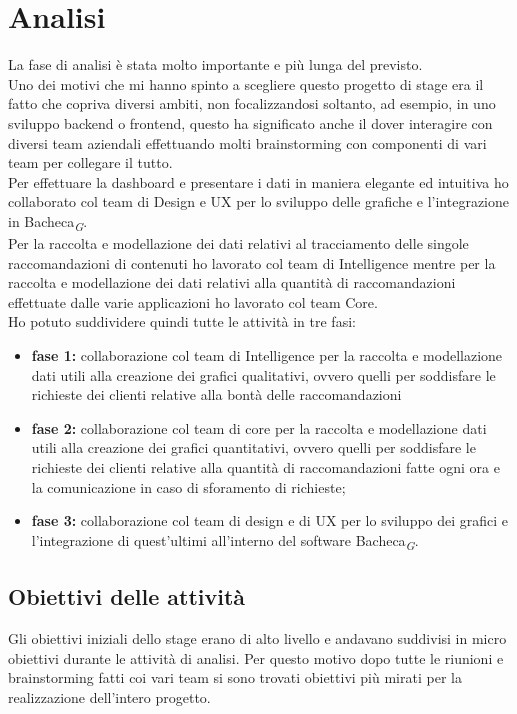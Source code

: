 \documentclass[a4paper, 12pt, twoside, openright]{book}
\newcommand{\gloss}[1]{#1\textsubscript{\textit{\tiny{G}}}}
\begin{document}
\section{Analisi}
\label{analisi}
La fase di analisi è stata molto importante e più lunga del previsto.\\
Uno dei motivi che mi hanno spinto a scegliere questo progetto di stage era il fatto che copriva diversi ambiti, non focalizzandosi soltanto, ad esempio, in uno sviluppo backend o frontend, questo ha significato anche il dover interagire con diversi team aziendali effettuando molti brainstorming con componenti di vari team per collegare il tutto.\\
Per effettuare la dashboard e presentare i dati in maniera elegante ed intuitiva ho collaborato col team di Design e UX per lo sviluppo delle grafiche e l'integrazione in \gloss{Bacheca}.\\Per la raccolta e modellazione  dei dati relativi al tracciamento delle singole raccomandazioni di contenuti ho lavorato col team di Intelligence mentre per la raccolta e modellazione dei dati relativi alla quantità di raccomandazioni effettuate dalle varie applicazioni ho lavorato col team Core.\\
Ho potuto suddividere quindi tutte le attività in tre fasi:
\begin{itemize}
\item \textbf{fase 1:} collaborazione col team di Intelligence per la raccolta e modellazione dati utili alla creazione dei grafici qualitativi, ovvero quelli per soddisfare le richieste dei clienti relative alla bontà delle raccomandazioni
\item \textbf{fase 2:} collaborazione col team di core per la raccolta e modellazione dati utili alla creazione dei grafici quantitativi, ovvero quelli per soddisfare le richieste dei clienti relative alla quantità di raccomandazioni fatte ogni ora e la comunicazione in caso di sforamento di richieste;
\item \textbf{fase 3:} collaborazione col team di design e di UX per lo sviluppo dei grafici e l'integrazione di quest'ultimi all'interno del software \gloss{Bacheca}.
\end{itemize}

\newpage{}
\subsection{Obiettivi delle attività}
Gli obiettivi iniziali dello stage erano di alto livello e andavano suddivisi in micro obiettivi durante le attività di analisi. Per questo motivo dopo tutte le riunioni e brainstorming fatti coi vari team si sono trovati obiettivi più mirati per la realizzazione dell'intero progetto.\\
\end{document}
